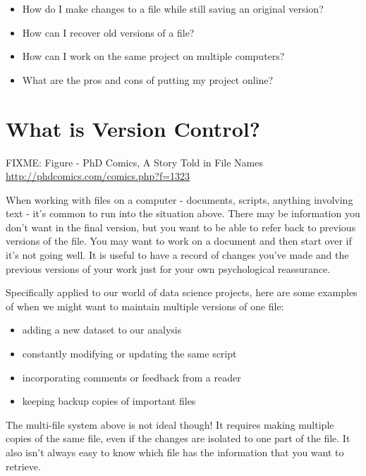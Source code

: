 \documentclass[]{Nemilov}
\providecommand{\tightlist}{%
  \setlength{\itemsep}{0pt}\setlength{\parskip}{0pt}}
\begin{document}
\begin{itemize}
\tightlist
\item
  How do I make changes to a file while still saving an original version?
\item
  How can I recover old versions of a file?
\item
  How can I work on the same project on multiple computers?
\item
  What are the pros and cons of putting my project online?
\end{itemize}

\hypertarget{py-version-control-intro}{%
\section{What is Version Control?}\label{py-version-control-intro}}

FIXME: Figure - PhD Comics, A Story Told in File Names \url{http://phdcomics.com/comics.php?f=1323}

When working with files on a computer - documents, scripts, anything involving
text - it's common to run into the situation above.
There may be information you don't want
in the final version, but you want to be able to refer back to previous versions
of the file. You may want to
work on a document and then start over if it's not going well.
It is useful to have a record of changes you've
made and the previous versions of your work just for your own psychological reassurance.

Specifically applied to our world of data science projects, here are some
examples of when we might want to maintain multiple versions of one file:

\begin{itemize}
\tightlist
\item
  adding a new dataset to our analysis
\item
  constantly modifying or updating the same script
\item
  incorporating comments or feedback from a reader
\item
  keeping backup copies of important files
\end{itemize}

The multi-file system above is not ideal though!
It requires making multiple copies of the
same file, even if the changes are isolated to one part of the file. It also
isn't always easy to know which file has the information that you want
to retrieve.
\end{document}

